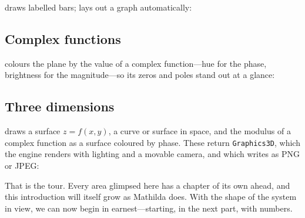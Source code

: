  draws labelled bars;  lays out a graph automatically:



\subsection{Complex functions}

 colours the plane by the value of a complex function---hue for the phase,
brightness for the magnitude---so its zeros and poles stand out at a glance:


\subsection{Three dimensions}

 draws a surface $z=f(x,y)$,  a curve or surface in space,
and  the modulus of a complex function as a surface coloured by phase.
These return \texttt{Graphics3D}, which the engine renders with lighting and a movable camera,
and which  writes as PNG or JPEG:




\bigskip
\noindent
That is the tour. Every area glimpsed here has a chapter of its own ahead, and this
introduction will itself grow as Mathilda does. With the shape of the system in view,
we can now begin in earnest---starting, in the next part, with numbers.
